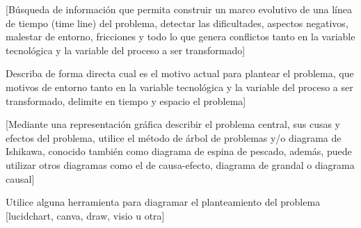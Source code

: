 [Búsqueda de información que permita construir un marco evolutivo de una línea de tiempo (time line) del problema, detectar las dificultades, aspectos negativos, malestar de entorno, fricciones y todo lo que genera conflictos tanto en la variable tecnológica y la variable del proceso a ser transformado]

Describa de forma directa cual es el motivo actual para plantear el problema, que motivos de entorno tanto en la variable tecnológica y la variable del proceso a ser transformado, delimite en tiempo y espacio el problema]

[Mediante una representación gráfica describir el problema central, sus cusas y efectos del problema, utilice el método de árbol de problemas y/o diagrama de Ishikawa, conocido también como diagrama de espina de pescado, además, puede utilizar otros diagramas como el de causa-efecto, diagrama de grandal o diagrama causal]

Utilice alguna herramienta para diagramar el planteamiento del problema [lucidchart, canva, draw, visio u otra]
